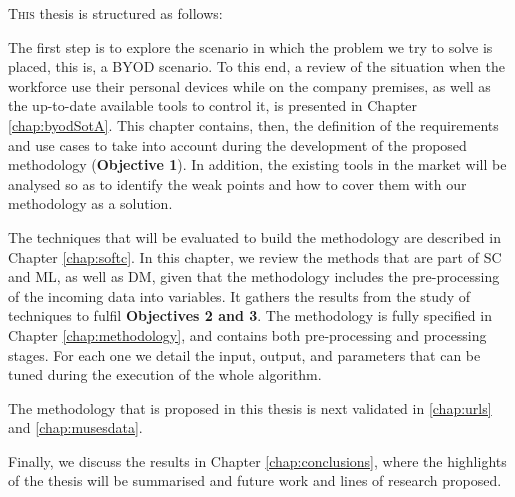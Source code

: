 \lettrine{T}{his} thesis is structured as follows:

The first step is to explore the scenario in which the problem we try to solve is placed, this is, a BYOD scenario. To this end, a review of the situation when the workforce use their personal devices while on the company premises, as well as the up-to-date available tools to control it, is presented in Chapter \ref{chap:byodSotA}. This chapter contains, then, the definition of the requirements and use cases to take into account during the development of the proposed methodology (\textbf{Objective 1}). In addition, the existing tools in the market will be analysed so as to identify the weak points and how to cover them with our methodology as a solution.

The techniques that will be evaluated to build the methodology are described in Chapter \ref{chap:softc}. In this chapter, we review the methods that are part of SC and ML, as well as DM, given that the methodology includes the pre-processing of the incoming data into variables. It gathers the results from the study of techniques to fulfil \textbf{Objectives 2 and 3}. The methodology is fully specified in Chapter \ref{chap:methodology}, and contains both pre-processing and processing stages. For each one we detail the input, output, and parameters that can be tuned during the execution of the whole algorithm.

The methodology that is proposed in this thesis is next validated in \ref{chap:urls} and \ref{chap:musesdata}.

Finally, we discuss the results in Chapter \ref{chap:conclusions}, where the highlights of the thesis will be summarised and future work and lines of research proposed.

